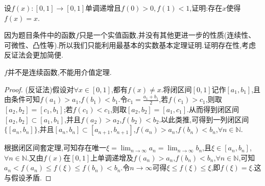 \documentclass[../../main.tex]{subfiles}%
\begin{document}
\begin{example}
设\(f(x):[0,1]\to[0,1]\)单调递增且\(f(0)>0,f(1)<1\),证明:存在\(x\)使得\(f(x)=x\).
\end{example}
\begin{note}
因为题目条件中的函数$f$只是一个实值函数,并没有其他更进一步的性质(连续性、可微性、凸性等).所以我们只能利用最基本的实数基本定理证明.证明存在性,考虑反证法会更加简便.
\end{note}
\begin{remark}
$f$并不是连续函数,不能用介值定理.
\end{remark}
\begin{proof}
(反证法)假设对$\forall x\in[0,1]$,都有$f(x)\ne x$.将闭区间\([0,1]\)记作\([a_1,b_1]\),且由条件可知\(f(a_1)>a_1\),\(f(b_1)<b_1\).令\(c_1=\frac{a_1 + b_1}{2}\),若\(f(c_1)>c_1\),则取\([a_2,b_2]=[c_1,b_1]\);若\(f(c_1)<c_1\),则取\([a_2,b_2]=[a_1,c_1]\).从而得到闭区间\([a_2,b_2]\subset [a_1,b_1]\),并且\(f(a_2)>a_2\),\(f(b_2)<b_2\).以此类推,可得到一列闭区间\(\{[a_n,b_n]\}\),并且\([a_n,b_n]\subset [a_{n + 1},b_{n + 1}]\),\(f(a_n)>a_n\),\(f(b_n)<b_n\),\(\forall n\in\mathbb{N}\).

根据闭区间套定理,可知存在唯一\(\xi=\lim_{n\rightarrow\infty}a_n=\lim_{n\rightarrow\infty}b_n\),且\(\xi\in [a_n,b_n]\),\(\forall n\in\mathbb{N}\).又由\(f(x)\)在\([0,1]\)上单调递增及\(f(a_n)>a_n\),\(f(b_n)<b_n\),\(\forall n\in\mathbb{N}\),可知\(a_n<f(a_n)\leqslant f(\xi)\leqslant f(b_n)<b_n\).令\(n\rightarrow\infty\)可得\(\xi\leqslant f(\xi)\leqslant\xi\),即\(f(\xi)=\xi\).这与假设矛盾.
\end{proof}
\end{document}
